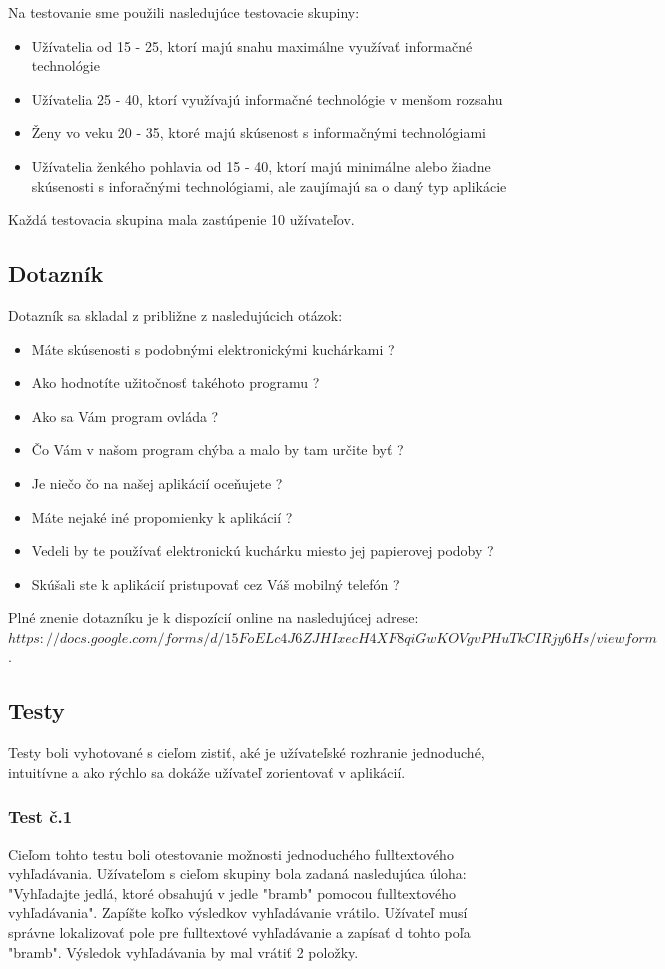 \documentclass[12pt,a4paper,titlepage,final]{article}
\begin{document}
Na testovanie sme použili nasledujúce testovacie skupiny:
\begin{itemize}
\item Užívatelia od 15 - 25, ktorí majú snahu maximálne využívať informačné technológie
\item Užívatelia 25 - 40, ktorí využívajú informačné technológie v menšom rozsahu
\item Ženy vo veku 20 - 35, ktoré majú skúsenost s informačnými technológiami
\item Užívatelia ženkého pohlavia od 15 - 40, ktorí majú minimálne alebo žiadne skúsenosti s inforačnými technológiami, ale zaujímajú sa o daný typ aplikácie
\end{itemize}
Každá testovacia skupina mala zastúpenie 10 užívateľov.

\subsection{Dotazník}
Dotazník sa skladal z približne z nasledujúcich otázok:
\begin{itemize}
\item Máte skúsenosti s podobnými elektronickými kuchárkami ?
\item Ako hodnotíte užitočnosť takéhoto programu ?
\item Ako sa Vám program ovláda ?
\item Čo Vám v našom program chýba a malo by tam určite byť ?
\item Je niečo čo na našej aplikácií oceňujete ?
\item Máte nejaké iné propomienky k aplikácií ?
\item Vedeli by te používať elektronickú kuchárku miesto jej papierovej podoby ?
\item Skúšali ste k aplikácií pristupovať cez Váš mobilný telefón ?


\end{itemize}
Plné znenie dotazníku je k dispozícií online na nasledujúcej adrese:$https://docs.google.com/forms/d/15FoELc4J6ZJHIxecH4XF8qiGwKOVgvPHuTkCIRjy6Hs/viewform$. 

\subsection{Testy}
Testy boli vyhotované s cieľom zistiť, aké je užívateľské rozhranie jednoduché, intuitívne a ako rýchlo sa dokáže užívateľ zorientovať v aplikácií. 

\subsubsection{Test č.1}
Cieľom tohto testu boli otestovanie možnosti jednoduchého fulltextového vyhľadávania. Užívateľom s cieľom skupiny bola zadaná nasledujúca úloha: "Vyhľadajte jedlá, ktoré obsahujú v jedle "bramb" pomocou fulltextového vyhľadávania". Zapíšte koľko výsledkov vyhľadávanie vrátilo. Užívateľ musí správne lokalizovať pole pre fulltextové vyhľadávanie a zapísať d tohto poľa "bramb". Výsledok vyhľadávania by mal vrátiť 2 položky.
\end{document}

